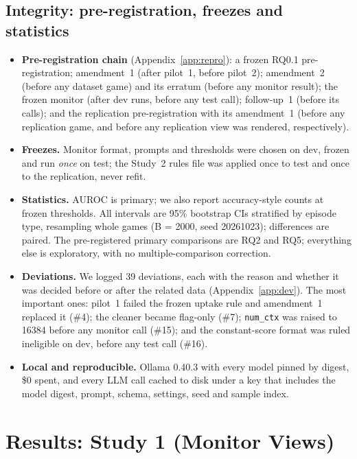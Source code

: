 \documentclass[conference]{IEEEtran}
\begin{document}
\subsection{Integrity: pre-registration, freezes and statistics}
\begin{itemize}
  \item \textbf{Pre-registration chain} (Appendix~\ref{app:repro}): a frozen RQ0.1 pre-registration; amendment~1
  (after pilot~1, before pilot~2); amendment~2 (before any dataset game) and its erratum (before any monitor
  result); the frozen monitor (after dev runs, before any test call); follow-up~1 (before its calls); and the
  replication pre-registration with its amendment~1 (before any replication game, and before any replication
  view was rendered, respectively).
  \item \textbf{Freezes.} Monitor format, prompts and thresholds were chosen on dev, frozen and run \emph{once} on
  test; the Study~2 rules file was applied once to test and once to the replication, never refit.
  \item \textbf{Statistics.} AUROC is primary; we also report accuracy-style counts at frozen thresholds. All
  intervals are 95\% bootstrap CIs stratified by episode type, resampling whole games (B = 2000, seed 20261023);
  differences are paired. The pre-registered primary comparisons are RQ2 and RQ5; everything else is
  exploratory, with no multiple-comparison correction.
  \item \textbf{Deviations.} We logged 39 deviations, each with the reason and whether it was decided before or
  after the related data (Appendix~\ref{app:dev}). The most important ones: pilot~1 failed the frozen uptake
  rule and amendment~1 replaced it (\#4); the cleaner became flag-only (\#7); \texttt{num\_ctx} was raised to 16384
  before any monitor call (\#15); and the constant-score format was ruled ineligible on dev, before any test
  call (\#16).
  \item \textbf{Local and reproducible.} Ollama 0.40.3 with every model pinned by digest, \$0 spent, and every LLM
  call cached to disk under a key that includes the model digest, prompt, schema, settings, seed and sample index.
\end{itemize}

\section{Results: Study 1 (Monitor Views)}
\label{sec:22}
\end{document}
